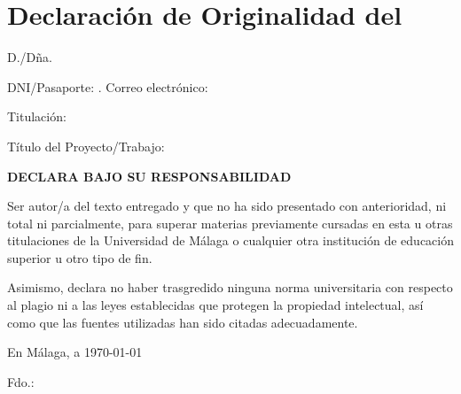 
\chapter*{Declaración de Originalidad del \tfeTFE}

\begin{flushleft}
    D./Dña. \textrm{\tfeAuthor}
    
    DNI/Pasaporte: \tfeNIF. Correo electrónico: \tfeEmail
    
    Titulación: \tfeDegree
    
    Título del Proyecto/Trabajo: \tfeTitle
\end{flushleft}

\begin{center}
    {\LARGE \textbf{DECLARA BAJO SU RESPONSABILIDAD}}
\end{center}

Ser autor/a del texto entregado y que no ha sido presentado con anterioridad, ni total ni parcialmente, para superar materias previamente cursadas en esta u otras titulaciones de la Universidad de Málaga o cualquier otra institución de educación superior u otro tipo de fin.


Asimismo, declara no haber trasgredido ninguna norma universitaria con respecto al plagio ni a las leyes establecidas que protegen la propiedad intelectual, así como que las fuentes utilizadas han sido citadas adecuadamente.

\vspace{1cm}


\begin{flushright}
    En Málaga, a \today
    
    \vspace{4cm}
    
    \textsf Fdo.: \tfeAuthor
\end{flushright}

